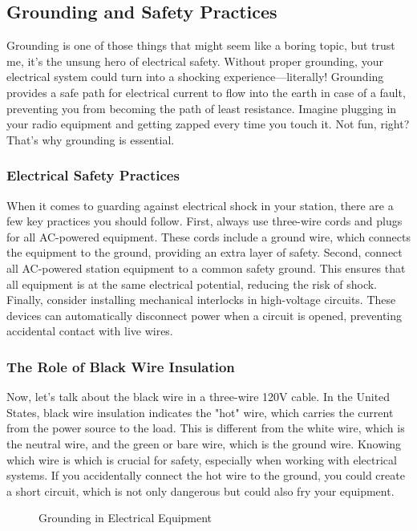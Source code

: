 \subsection{Grounding and Safety Practices}
\label{subsec:ground-safety}

Grounding is one of those things that might seem like a boring topic, but trust me, it’s the unsung hero of electrical safety. Without proper grounding, your electrical system could turn into a shocking experience—literally! Grounding provides a safe path for electrical current to flow into the earth in case of a fault, preventing you from becoming the path of least resistance. Imagine plugging in your radio equipment and getting zapped every time you touch it. Not fun, right? That’s why grounding is essential.

\subsubsection*{Electrical Safety Practices}
When it comes to guarding against electrical shock in your station, there are a few key practices you should follow. First, always use three-wire cords and plugs for all AC-powered equipment. These cords include a ground wire, which connects the equipment to the ground, providing an extra layer of safety. Second, connect all AC-powered station equipment to a common safety ground. This ensures that all equipment is at the same electrical potential, reducing the risk of shock. Finally, consider installing mechanical interlocks in high-voltage circuits. These devices can automatically disconnect power when a circuit is opened, preventing accidental contact with live wires.

\subsubsection*{The Role of Black Wire Insulation}
Now, let’s talk about the black wire in a three-wire 120V cable. In the United States, black wire insulation indicates the "hot" wire, which carries the current from the power source to the load. This is different from the white wire, which is the neutral wire, and the green or bare wire, which is the ground wire. Knowing which wire is which is crucial for safety, especially when working with electrical systems. If you accidentally connect the hot wire to the ground, you could create a short circuit, which is not only dangerous but could also fry your equipment.

\begin{figure}[h]
    \centering
    \caption{Grounding in Electrical Equipment}
    \label{fig:grounding}
\end{figure}

